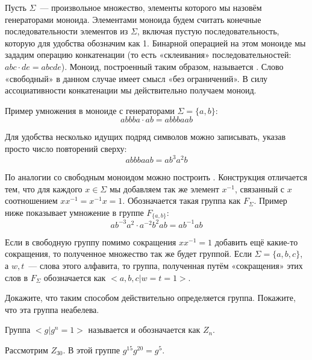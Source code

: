 \begin{example}
	Пусть $\Sigma$~— произвольное множество, элементы которого мы назовём генераторами моноида. Элементами моноида будем считать конечные последовательности элементов из $\Sigma$, включая пустую последовательность, которую для удобства обозначим как 1. Бинарной операцией на этом моноиде мы зададим операцию конкатенации (то есть «склеивания» последовательностей: $abc\cdot de = abcde$). Моноид, построенный таким образом, называется . Слово «свободный» в данном случае имеет смысл «без ограничений». В силу ассоциативности конкатенации мы действительно получаем моноид.
\end{example}

\begin{example}
	Пример умножения в моноиде с генераторами $\Sigma=\{a, b\}$:
	\[
	abbba\cdot ab = abbbaab
	\]
\end{example}

Для удобства несколько идущих подряд символов можно записывать, указав просто число повторений сверху:
\[
abbbaab = ab^3a^2b
\]

\begin{example}
	По аналогии со свободным моноидом можно построить . Конструкция отличается тем, что для каждого $x\in\Sigma$ мы добавляем так же  элемент $x^{-1}$, связанный с $x$ соотношением $xx^{-1}=x^{-1}x=1$. Обозначается такая группа как $F_\Sigma$. Пример ниже показывает умножение в группе $F_{\{a, b\}}$:
	\[
	ab^{-3}a^2\cdot a^{-2}b^2ab = ab^{-1}ab
	\]
\end{example}

Если в свободную группу помимо сокращения $xx^{-1}=1$ добавить ещё какие-то сокращения, то полученное множество так же будет группой. Если $\Sigma = \{a, b, c\}$, а $w, t$~— слова этого алфавита, то группа, полученная путём «сокращения» этих слов в $F_\Sigma$ обозначается как $<a, b, c | w = t = 1>$.

\begin{exercise}
	Докажите, что таким способом действительно определяется группа. Покажите, что эта группа неабелева.
\end{exercise}

\begin{example}
	Группа $<g|g^n = 1>$ называется  и обозначается как $Z_n$.
\end{example}

\begin{example}
	Рассмотрим $Z_{30}$. В этой группе $g^{15}g^{20} = g^5$.
\end{example}

